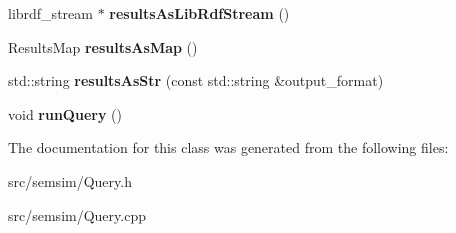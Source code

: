 \begin{DoxyCompactItemize}
\item 
\mbox{\label{classsemsim_1_1Query_a83580c1b66d2d052696dd907e8594a8a}} 
librdf\+\_\+stream $\ast$ {\bfseries results\+As\+Lib\+Rdf\+Stream} ()
\item 
\mbox{\label{classsemsim_1_1Query_a16b43e8d44b25e0d1fba34c73c5386dc}} 
Results\+Map {\bfseries results\+As\+Map} ()
\item 
\mbox{\label{classsemsim_1_1Query_ae44b7aff3ae00151f63cc3a355705091}} 
std\+::string {\bfseries results\+As\+Str} (const std\+::string \&output\+\_\+format)
\item 
\mbox{\label{classsemsim_1_1Query_ad629d8d9265fdc07dc88a698de69f2d9}} 
void {\bfseries run\+Query} ()
\end{DoxyCompactItemize}


The documentation for this class was generated from the following files\+:\begin{DoxyCompactItemize}
\item 
src/semsim/Query.\+h\item 
src/semsim/Query.\+cpp\end{DoxyCompactItemize}
